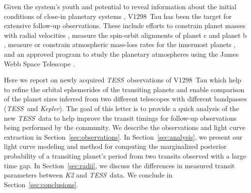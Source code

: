 \documentclass[linenumbers,twocolumn]{aastex631}
\newcommand{\tess}{\textit{TESS}}
\newcommand{\sname}{V1298~Tau\xspace}
\begin{document}
Given the system's youth and potential to reveal information about the initial conditions of close-in planetary systems \citep[e.g.][]{Owen2020,Poppenhaeger2021}, \sname has been the target for extensive follow-up observations. These include efforts to constrain planet masses with radial velocities \citep{Beichman2019,suarez21}, measure the spin-orbit alignments of planet c \citep{Feinstein21} and planet b \citep{johnson21, gaidos21}, measure or constrain atmospheric mass-loss rates for the innermost planets \citep{Schlawin21, Vissapragada21}, and an approved program to study the planetary atmospheres using the James Webb Space Telescope \citep[JWST;][]{Desert2021}.

Here we report on newly acquired \tess\ observations of \sname which help to refine the orbital ephemerides of the transiting planets and enable comparison of the planet sizes inferred from two different telescopes with different bandpasses (\tess\ and \textit{Kepler}). The goal of this letter is to provide a quick analysis of the new \tess\ data to help improve the transit timings for follow-up observations being performed by the community. We describe the observations and light curve extraction in Section~\ref{sec:observations}. In Section~\ref{sec:analysis}, we present our light curve modeling and method for computing the marginalized posterior probability of a transiting planet's period from two transits observed with a large time gap. In Section~\ref{sec:radii}, we discuss the differences in measured transit parameters between \textit{K2} and \tess\ data. We conclude in Section~\ref{sec:conclusions}.
\end{document}
